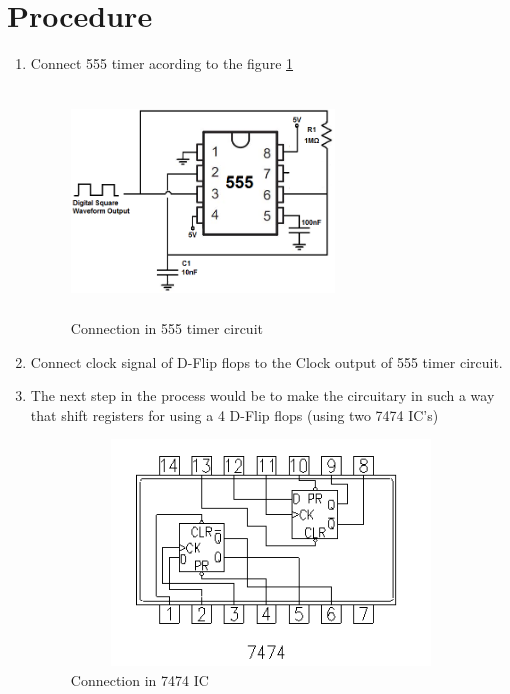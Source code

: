 \documentclass[12pt]{article}
\begin{document}
\section*{Procedure}
\begin{enumerate}[]
	\item Connect 555 timer acording to the figure \ref{555_t_c}
	\begin{figure}[h!]
		\includegraphics[width=7cm, height=6cm]{figs/555.png}
		\caption{Connection in 555 timer circuit}
		\label{555_t_c}
	\end{figure}
	
	\item Connect clock signal of D-Flip flops to the Clock output of 555 timer circuit.
	
	\item The next step in the process would be to make the circuitary in such a way that shift registers for using a 4 D-Flip flops (using two 7474 IC's)
	
	\begin{figure}[h!]
		\begin{center}
			
			\includegraphics[width=11cm, height=6cm]{figs/IC7474.png}
			\caption{Connection in 7474 IC}
			\label{7474_IC}
			
		\end{center}
	\end{figure}
	

\end{enumerate}
\end{document}
